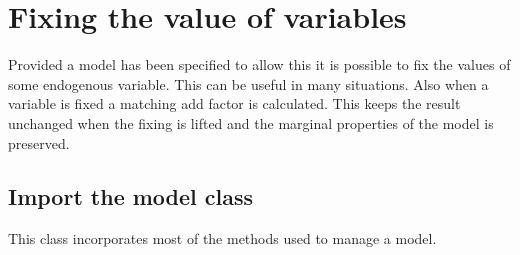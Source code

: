 \documentclass[letterpaper,10pt,english]{jupyterBook}
\begin{document}
\chapter{Fixing the value of variables}
\label{\detokenize{content/howto/fixing/Fixing variables:fixing-the-value-of-variables}}\label{\detokenize{content/howto/fixing/Fixing variables::doc}}
\sphinxAtStartPar
Provided a model has been specified to allow this it is possible to fix the values of some endogenous variable. This can be
useful in many situations. Also when a variable is fixed a matching add factor is calculated. This keeps the result unchanged
when the fixing is lifted and the marginal properties of the model is preserved.


\section{Import the model class}
\label{\detokenize{content/howto/fixing/Fixing variables:import-the-model-class}}
\sphinxAtStartPar
This class incorporates most of the methods used to manage a model.
\end{document}

